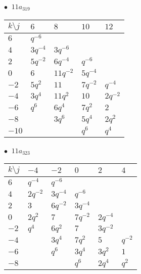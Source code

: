 \begin{minipage}{\linewidth}
$\bullet\ $ $11a_{319}$ \vspace{0.5em} \\
\begin{tabular}{l|llll}
$k \setminus j$ & $6$ & $8$ & $10$ & $12$ \\
\hline
$6$ & $q^{-6}$ &  &  &  \\
$4$ & $3q^{-4}$ & $3q^{-6}$ &  &  \\
$2$ & $5q^{-2}$ & $6q^{-4}$ & $q^{-6}$ &  \\
$0$ & $6$ & $11q^{-2}$ & $5q^{-4}$ &  \\
$-2$ & $5q^{2}$ & $11$ & $7q^{-2}$ & $q^{-4}$ \\
$-4$ & $3q^{4}$ & $11q^{2}$ & $10$ & $2q^{-2}$ \\
$-6$ & $q^{6}$ & $6q^{4}$ & $7q^{2}$ & $2$ \\
$-8$ &  & $3q^{6}$ & $5q^{4}$ & $2q^{2}$ \\
$-10$ &  &  & $q^{6}$ & $q^{4}$ \\
\end{tabular}
\vspace{2em}
\end{minipage}
%
\begin{minipage}{\linewidth}
$\bullet\ $ $11a_{323}$ \vspace{0.5em} \\
\begin{tabular}{l|lllll}
$k \setminus j$ & $-4$ & $-2$ & $0$ & $2$ & $4$ \\
\hline
$6$ & $q^{-4}$ & $q^{-6}$ &  &  &  \\
$4$ & $2q^{-2}$ & $3q^{-4}$ & $q^{-6}$ &  &  \\
$2$ & $3$ & $6q^{-2}$ & $3q^{-4}$ &  &  \\
$0$ & $2q^{2}$ & $7$ & $7q^{-2}$ & $2q^{-4}$ &  \\
$-2$ & $q^{4}$ & $6q^{2}$ & $7$ & $3q^{-2}$ &  \\
$-4$ &  & $3q^{4}$ & $7q^{2}$ & $5$ & $q^{-2}$ \\
$-6$ &  & $q^{6}$ & $3q^{4}$ & $3q^{2}$ & $1$ \\
$-8$ &  &  & $q^{6}$ & $2q^{4}$ & $q^{2}$ \\
\end{tabular}
\vspace{2em}
\end{minipage}
%
